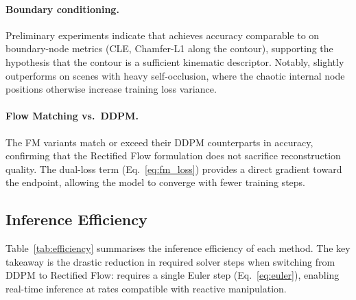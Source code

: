 \documentclass{article}
\begin{document}
\paragraph{Boundary conditioning.}
Preliminary experiments indicate that \edgeddpm{} achieves accuracy comparable to \fullddpm{} on boundary-node metrics (CLE, Chamfer-L1 along the contour), supporting the hypothesis that the contour is a sufficient kinematic descriptor.
Notably, \edgeddpm{} slightly outperforms \fullddpm{} on scenes with heavy self-occlusion, where the chaotic internal node positions otherwise increase training loss variance.

\paragraph{Flow Matching vs.\ DDPM.}
The FM variants match or exceed their DDPM counterparts in accuracy, confirming that the Rectified Flow formulation does not sacrifice reconstruction quality.
The dual-loss term (Eq.~\ref{eq:fm_loss}) provides a direct gradient toward the endpoint, allowing the model to converge with fewer training steps.

\subsection{Inference Efficiency}

Table~\ref{tab:efficiency} summarises the inference efficiency of each method.
The key takeaway is the drastic reduction in required solver steps when switching from DDPM to Rectified Flow: \edgefm{} requires a single Euler step (Eq.~\ref{eq:euler}), enabling real-time inference at rates compatible with reactive manipulation.
\end{document}
